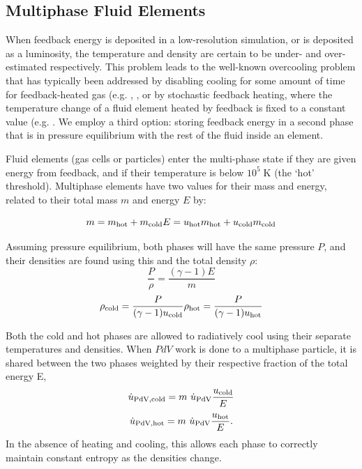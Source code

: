 \subsection{Multiphase Fluid Elements}
When feedback energy is deposited in a low-resolution simulation, or is
deposited as a luminosity, the temperature and density are certain to be under-
and over-estimated respectively.  This problem leads to the well-known
overcooling problem that has typically been addressed by disabling
cooling for some amount of time for feedback-heated gas (e.g.
\citet{Stinson2006}, \citet{Springel2003}, or by stochastic feedback heating,
where the temperature change of a fluid element heated by feedback is fixed to a
constant value (e.g.  \citet{DallaVecchia2012}.  We employ a third option:
storing feedback energy in a second phase that is in pressure equilibrium with
the rest of the fluid inside an element.

Fluid elements (gas cells or particles) enter the multi-phase state if they are
given energy from feedback, and if their temperature is below $10^5\;\mathrm{K}$
(the `hot' threshold).  Multiphase elements have two values for their mass and
energy, related to their total mass $m$ and energy $E$ by:

\begin{equation}\label{multiphase_fractions}
    m = m_{\rm hot}+m_{\rm cold}\\
    E = u_{\rm hot}m_{\rm hot}+u_{\rm cold}m_{\rm cold}
\end{equation}

Assuming pressure equilibrium, both phases will have the same pressure $P$, and
their densities are found using this and the total density $\rho$:
\begin{equation}\label{multiphase_pressurebalance}
    \frac{P}{\rho} = \frac{(\gamma-1)E}{m}
\end{equation}
\begin{equation}\label{multiphase_densities}
    \rho_{\rm cold} = \frac{P}{(\gamma-1)u_{\rm cold}}\\
    \rho_{\rm hot} = \frac{P}{(\gamma-1)u_{\rm hot}}
\end{equation}

Both the cold and hot phases are allowed to radiatively cool using their
separate temperatures and densities.   When $PdV$ work is done to a multiphase
particle, it is shared between the two phases weighted by their respective
fraction of the total energy E,
\begin{equation}\label{multiphase_PdV}
    \dot u_{\rm PdV,cold} = m\ \dot u_{\rm PdV}\frac{u_{\rm cold}}{E}\\
\end{equation}
\begin{equation}
    \dot u_{\rm PdV,hot} = m\ \dot u_{\rm PdV}\frac{u_{\rm hot}}{E}.
\end{equation}
In the absence of heating and cooling, this allows each phase to correctly
maintain constant entropy as the densities change.

